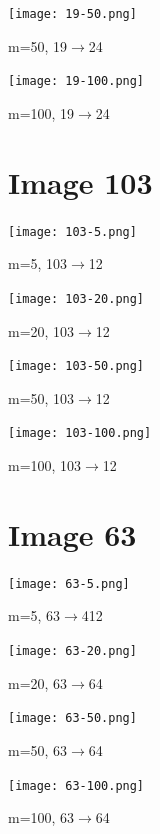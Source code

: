 \documentclass{article}
\begin{document}
\begin{center}
    \texttt{[image: 19-50.png]}
    \caption{m=50, 19$\rightarrow$24}
\end{center}

\begin{center}
    \texttt{[image: 19-100.png]}
    \caption{m=100, 19$\rightarrow$24}
\end{center}

\section{Image 103}

\begin{center}
    \texttt{[image: 103-5.png]}
    \caption{m=5, 103$\rightarrow$12}
\end{center}

\begin{center}
    \texttt{[image: 103-20.png]}
    \caption{m=20, 103$\rightarrow$12}
\end{center}

\begin{center}
    \texttt{[image: 103-50.png]}
    \caption{m=50, 103$\rightarrow$12}
\end{center}

\begin{center}
    \texttt{[image: 103-100.png]}
    \caption{m=100, 103$\rightarrow$12}
\end{center}

\section{Image 63}

\begin{center}
    \texttt{[image: 63-5.png]}
    \caption{m=5, 63$\rightarrow$412}
\end{center}

\begin{center}
    \texttt{[image: 63-20.png]}
    \caption{m=20, 63$\rightarrow$64}
\end{center}

\begin{center}
    \texttt{[image: 63-50.png]}
    \caption{m=50, 63$\rightarrow$64}
\end{center}

\begin{center}
    \texttt{[image: 63-100.png]}
    \caption{m=100, 63$\rightarrow$64}
\end{center}
\end{document}
